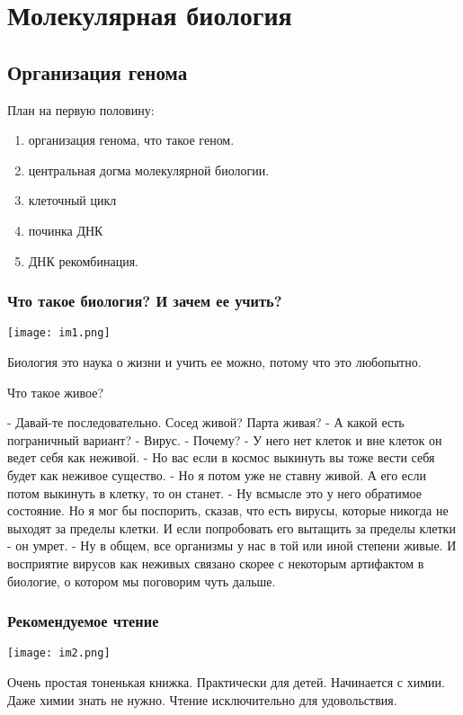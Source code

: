 ﻿\chapter{Молекулярная биология}
\section{Организация генома}

План на первую половину: 
\begin{enumerate}
\item организация генома, что такое геном. 
\item центральная догма молекулярной биологии.
\item клеточный цикл
\item починка ДНК
\item ДНК рекомбинация. 
\end{enumerate}

\subsection{Что такое биология? И зачем ее учить?}

\texttt{[image: im1.png]}

Биология это наука о жизни и учить ее можно, потому
что это любопытно.

Что такое живое?

- Давай-те последовательно. Сосед живой? Парта живая?
- А какой есть пограничный вариант? 
- Вирус. 
- Почему? 
- У него нет клеток и вне клеток он ведет себя как 
неживой. 
- Но вас если в космос выкинуть вы тоже вести себя будет как 
неживое существо. 
- Но я потом уже не ставну живой. А его если потом
выкинуть в клетку, то он станет.
- Ну всмысле это у него обратимое состояние. Но я
мог бы поспорить, сказав, что есть вирусы,
которые никогда не выходят за пределы клетки. И
если попробовать его вытащить за пределы клетки - он умрет.
- Ну в общем, все организмы у нас в той или иной степени живые. 
И восприятие вирусов как неживых связано скорее с некоторым артифактом
в биологие, о котором мы поговорим чуть дальше. 

\subsection{Рекомендуемое чтение}
\texttt{[image: im2.png]}

Очень простая тоненькая книжка. Практически для детей. Начинается 
с химии. Даже химии знать не нужно. Чтение исключительно для 
удовольствия. 

